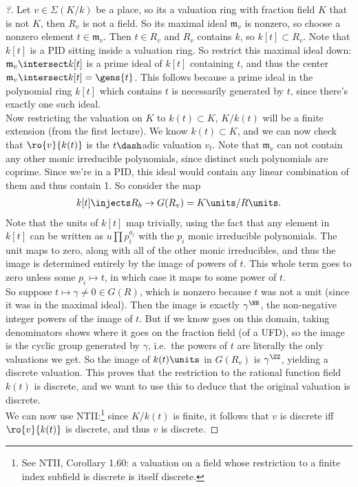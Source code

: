 \begin{proof}[?]

Let \(v\in \Sigma(K/k)\) be a place, so its a valuation ring with
fraction field \(K\) that is not \(K\), then \(R_v\) is not a field. So
its maximal ideal \(\mathfrak{m}_v\) is nonzero, so choose a nonzero
element \(t\in \mathfrak{m}_v\). Then \(t \in R_v\) and \(R_v\) contains
\(k\), so \(k[t] \subset R_v\). Note that \(k[t]\) is a PID sitting
inside a valuation ring. So restrict this maximal ideal down:
\(\mathfrak{m}_v \intersect k[t]\) is a prime ideal of \(k[t]\)
containing \(t\), and thus the center
\(\mathfrak{m}_v \intersect k[t] = \gens{t}\). This follows because a
prime ideal in the polynomial ring \(k[t]\) which contains \(t\) is
necessarily generated by \(t\), since there's exactly one such ideal.\\

Now restricting the valuation on \(K\) to \(k(t) \subset K\),
\(K / k(t)\) will be a finite extension (from the first lecture). We
know \(k(t) \subset K\), and we can now check that \(\ro{v}{k(t)}\) is
the \(t\dash\)adic valuation \(v_t\). Note that \(\mathfrak{m}_v\) can
not contain any other monic irreducible polynomials, since distinct such
polynomials are coprime. Since we're in a PID, this ideal would contain
any linear combination of them and thus contain 1. So consider the map
\begin{align*}  
k[t] \injects R_b \to G(R_v) = K\units / R\units
.\end{align*} Note that the units of \(k[t]\) map trivially, using the
fact that any element in \(k[t]\) can be written as
\(u \prod p_i^{a_i}\) with the \(p_i\) monic irreducible polynomials.
The unit maps to zero, along with all of the other monic irreducibles,
and thus the image is determined entirely by the image of powers of
\(t\). This whole term goes to zero unless some \(p_i\mapsto t\), in
which case it maps to some power of \(t\).\\

So suppose \(t\mapsto \gamma \neq 0\in G(R)\), which is nonzero because
\(t\) was not a unit (since it was in the maximal ideal). Then the image
is exactly \(\gamma^\NN\), the non-negative integer powers of the image
of \(t\). But if we know goes on this domain, taking denominators shows
where it goes on the fraction field (of a UFD), so the image is the
cyclic group generated by \(\gamma\), i.e.~the powers of \(t\) are
literally the only valuations we get. So the image of \(k(t)\units\) in
\(G(R_v)\) is \(\gamma^\ZZ\), yielding a discrete valuation. This proves
that the restriction to the rational function field \(k(t)\) is
discrete, and we want to use this to deduce that the original valuation
is discrete.\\

We can now use NTII:\footnote{See NTII, Corollary 1.60: a valuation on a
  field whose restriction to a finite index subfield is discrete is
  itself discrete.} since \(K/k(t)\) is finite, it follows that \(v\) is
discrete iff \(\ro{v}{k(t)}\) is discrete, and thus \(v\) is discrete.

\end{proof}

